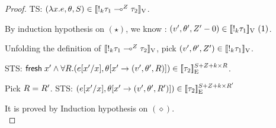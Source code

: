 \begin{proof}

   TS: $(\lambda x. \expr , \env, S) \in  \lrv{  \bang{\idx} \type_1\lto{\nnatA} \type_2 }$.

  By induction hypothesis on $(\star)$,  we know : $ (\valr', \env'
  ,\nnatA' -0) \in \lrv{\bang{k} \type_1} ~(1) $.

  Unfolding the definition of $\lrv{ \bang{\idx} \type_1\lto{\nnatA}
    \type_2 }$,  pick $ (\valr', \env' ,\nnatA') \in \lrv{\bang{k}
    \type_1} $.  

  STS: $ \fresh \eapp  x' \land \forall \adapt.  (\expr[x'/x] ,
  \env[x' \to (\valr', \theta', \adapt)] )  \in \lre{}{S+\nnatA+\idx
    \times \adapt}{\type_2} $.

  Pick $\adapt = \adapt'$.
  STS: $  (\expr[x'/x] ,
  \env[x' \to (\valr', \theta', \adapt')] )  \in \lre{}{S+\nnatA+\idx
    \times \adapt'}{\type_2} $

  It is proved by Induction hypothesis on $(\diamond)$. \\





 \end{proof} 